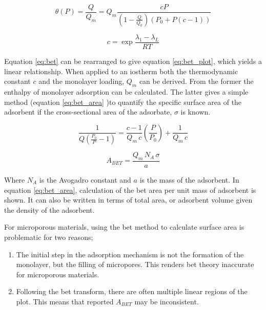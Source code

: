 \begin{equation}\label{eq:bet}
    \theta(P) = \frac{Q}{Q_m} =  Q_m \frac{c P}{\left( 1 - \frac{Q}{Q_0} \right) \left(P_0 + P \left(c - 1 \right) \right)}
\end{equation}

\begin{equation}\label{eq:bet_c}
    c = \exp{\frac{\lambda_1 - \lambda_L}{RT}}
\end{equation}

Equation \ref{eq:bet} can be rearranged to give equation \ref{eq:bet_plot}, which yields a linear relationship. When applied to an iostherm both the thermodynamic constant $c$ and the monolayer loading, $Q_m$ can be derived. From the former the enthalpy of monolayer adsorption can be calculated. The latter gives a simple method (equation \ref{eq:bet_area} )to quantify the specific surface area of the \gls{adsorbent} if the cross-sectional area of the \gls{adsorbate}, $\sigma$ is known.

\begin{equation} \label{eq:bet_plot}
    \frac{1}{Q  \left( \frac{P_0}{P} - 1 \right)} = \frac{c-1}{Q_m \, c}  \left( \frac{P}{P_0} \right) + \frac{1}{Q_m \, c}
\end{equation}

\begin{equation}\label{eq:bet_area}
    A_{BET} = \frac{Q_m \, N_A \, \sigma}{a}
\end{equation}

Where $N_A$ is the Avogadro constant and $a$ is the mass of the \gls{adsorbent}.\citep{Brunauer1938Adsorption} In equation \ref{eq:bet_area}, calculation of the \acrshort{bet} area per unit mass of \gls{adsorbent} is shown. It can also be written in terms of total area, or \gls{adsorbent} volume given the density of the \gls{adsorbent}.

For microporous materials, using the \acrshort{bet} method to calculate surface area is problematic for two reasons;

	\begin{enumerate}[label=(\arabic*)]
		\item The initial step in the \gls{adsorption} mechanism is not the formation of the monolayer, but the filling of \glspl{micropore}. This renders \acrshort{bet} theory inaccurate for microporous materials.
		\item 	Following the \acrshort{bet} transform, there are often multiple linear regions of the plot. This means that reported $A_{BET}$ may be inconsistent.
	\end{enumerate}

